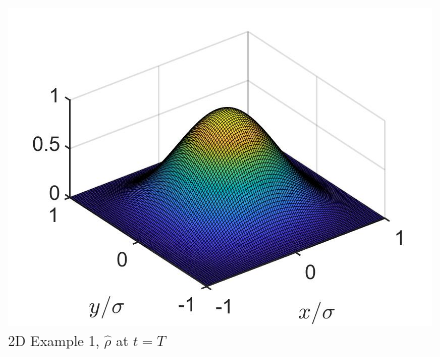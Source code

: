 \documentclass[11pt, a4paper]{article}
\theoremstyle{definition}
\begin{document}
	\begin{figure}[h]
		\includegraphics[scale=0.3]{rhoHat2D1.jpg}
		\caption{2D Example 1, $\hat \rho$ at $t=T$}
		\label{rhoHat2d1}
	\end{figure}
	
\end{document}
